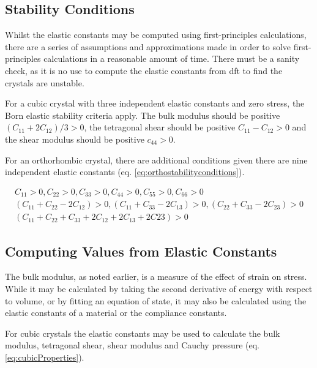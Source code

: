 \FloatBarrier


\subsection{Stability Conditions}
\label{section:stabilityconditions}

Whilst the elastic constants may be computed using first-principles calculations, there are a series of assumptions and approximations made in order to solve first-principles calculations in a reasonable amount of time.  There must be a sanity check, as it is no use to compute the elastic constants from \acrshort{dft} to find the crystals are unstable.

For a cubic crystal with three independent elastic constants and zero stress, the Born elastic stability criteria apply\cite{acklandec}.  The bulk modulus should be positive $(C_{11}+2 C_{12}) / 3 > 0$, the tetragonal shear should be positive $C_{11} - C_{12} > 0$ and the shear modulus should be positive $c_{44} > 0$.

For an orthorhombic crystal, there are additional conditions given there are nine independent elastic constants (eq. \ref{eq:orthostabilityconditions})\cite{ghoshstability}.

\begin{equation}
\begin{split}
C_{11} > 0, C_{22} > 0, C_{33} > 0, C_{44} > 0, C_{55} > 0, C_{66} > 0 \\
(C_{11} + C_{22} - 2 C_{12}) > 0, (C_{11} + C_{33} - 2 C_{13}) > 0, (C_{22} + C_{33} - 2 C_{23}) > 0 \\
(C_{11} + C_{22} + C_{33} + 2 C_{12} + 2 C_{13} + 2 C{23}) > 0
\end{split}
\label{eq:orthostabilityconditions}
\end{equation}


\subsection{Computing Values from Elastic Constants}

The bulk modulus, as noted earlier, is a measure of the effect of strain on stress.  While it may be calculated by taking the second derivative of energy with respect to volume, or by fitting an equation of state, it may also be calculated using the elastic constants of a material or the compliance constants.

For cubic crystals the elastic constants may be used to calculate the bulk modulus, tetragonal shear, shear modulus and Cauchy pressure (eq. \ref{eq:cubicProperties}).

